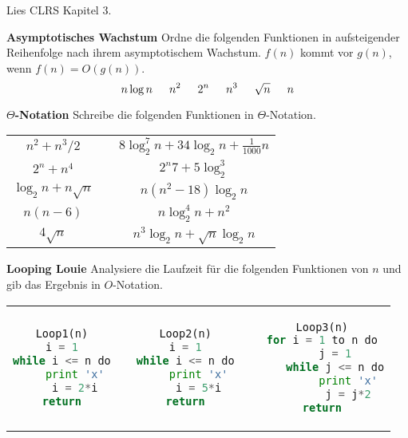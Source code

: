 \documentclass{uebung_cs}
\begin{document}
\begin{aufgabe}\label{lesen}
	Lies CLRS Kapitel 3.
\end{aufgabe}

\begin{aufgabe}[\warmup] \textbf{Asymptotisches Wachstum} \label{tue-first}\mbox{}
	Ordne die folgenden Funktionen in aufsteigender Reihenfolge nach ihrem asymptotischem Wachstum.
	$f(n)$ kommt vor $g(n)$, wenn $f(n) = O(g(n))$.
	\[n \log n\hspace*{15pt} n^2\hspace*{15pt} 2^n\hspace*{15pt} n^3\hspace*{15pt} \sqrt{n}\hspace*{15pt} n\]
	
\end{aufgabe}

\begin{aufgabe}
	\textbf{$\Theta$-Notation}
	Schreibe die folgenden Funktionen in $\Theta$-Notation.
	\begin{center}
		\begin{tabular}{ccc}
			$n^2 + n^3/2$
			&\mbox{}\hspace{2cm}\mbox{}&
			$8\log_2^7 n + 34\log_2 n + \frac{1}{1000}n$\\
			$2^n + n^4$&&
			$2^n7 + 5\log_2^3$\\
			$\log_2n + n\sqrt{n}$&&
			$n(n^2 - 18)\log_2 n$\\
			$n(n-6)$&&
			$n\log_2^4 n + n^2$\\
			$4\sqrt{n}$&&
			$n^3 \log_2 n + \sqrt{n}\log_2 n$
		\end{tabular}
	\end{center}
	
\end{aufgabe}

\begin{aufgabe}
	\textbf{Looping Louie}
	Analysiere die Laufzeit für die folgenden Funktionen von $n$ und gib das Ergebnis in $O$-Notation.
	\begin{center}
		\begin{tabular}{ccccc}

\begin{lstlisting}[language=Python]
Loop1(n)
i = 1
while i <= n do
	print 'x'
	i = 2*i
return
\end{lstlisting}		
		
			&\mbox{}\hspace{2cm}\mbox{}&

\begin{lstlisting}[language=Python]
Loop2(n)
i = 1
while i <= n do
	print 'x'
	i = 5*i
return
\end{lstlisting}

			
			&\mbox{}\hspace{2cm}\mbox{}&
			
\begin{lstlisting}[language=Python]
Loop3(n)
for i = 1 to n do
	j = 1
	while j <= n do
		print 'x'
		j = j*2
return
\end{lstlisting}
		\end{tabular}
	\end{center}
\end{aufgabe}
\end{document}
